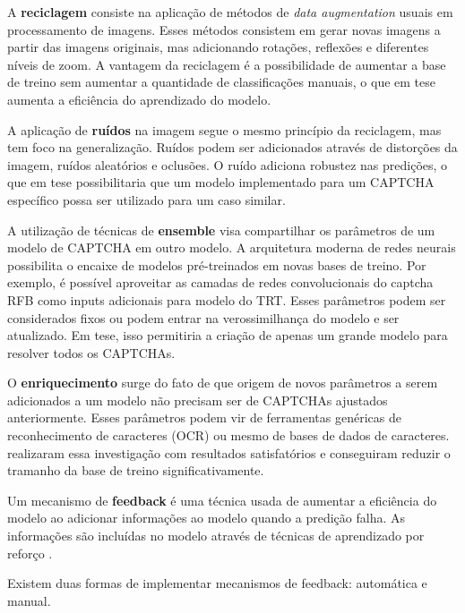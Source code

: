 \documentclass[12pt,]{report}
\begin{document}
A \textbf{reciclagem} consiste na aplicação de métodos de \emph{data augmentation} usuais em processamento de imagens. Esses métodos consistem em gerar novas imagens a partir das imagens originais, mas adicionando rotações, reflexões e diferentes níveis de zoom. A vantagem da reciclagem é a possibilidade de aumentar a base de treino sem aumentar a quantidade de classificações manuais, o que em tese aumenta a eficiência do aprendizado do modelo.

A aplicação de \textbf{ruídos} na imagem segue o mesmo princípio da reciclagem, mas tem foco na generalização. Ruídos podem ser adicionados através de distorções da imagem, ruídos aleatórios e oclusões. O ruído adiciona robustez nas predições, o que em tese possibilitaria que um modelo implementado para um CAPTCHA específico possa ser utilizado para um caso similar.

A utilização de técnicas de \textbf{ensemble} visa compartilhar os parâmetros de um modelo de CAPTCHA em outro modelo. A arquitetura moderna de redes neurais possibilita o encaixe de modelos pré-treinados em novas bases de treino. Por exemplo, é possível aproveitar as camadas de redes convolucionais do captcha RFB como inputs adicionais para modelo do TRT. Esses parâmetros podem ser considerados fixos ou podem entrar na verossimilhança do modelo e ser atualizado. Em tese, isso permitiria a criação de apenas um grande modelo para resolver todos os CAPTCHAs.

O \textbf{enriquecimento} surge do fato de que origem de novos parâmetros a serem adicionados a um modelo não precisam ser de CAPTCHAs ajustados anteriormente. Esses parâmetros podem vir de ferramentas genéricas de reconhecimento de caracteres (OCR) ou mesmo de bases de dados de caracteres. \citet{george2017generative} realizaram essa investigação com resultados satisfatórios e conseguiram reduzir o tramanho da base de treino significativamente.

Um mecanismo de \textbf{feedback} é uma técnica usada de aumentar a eficiência do modelo ao adicionar informações ao modelo quando a predição falha. As informações são incluídas no modelo através de técnicas de aprendizado por reforço \citep{sutton1998introduction}.

Existem duas formas de implementar mecanismos de feedback: automática e manual.
\end{document}
